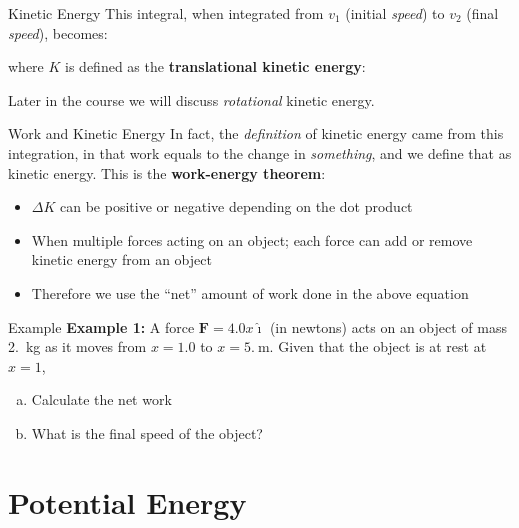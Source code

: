 \documentclass[12pt,compress,aspectratio=169]{beamer}
\begin{document}
\begin{frame}{Kinetic Energy}
  This integral, when integrated from $v_1$ (initial \emph{speed}) to $v_2$
  (final \emph{speed}), becomes:

  
  where $K$ is defined as the \textbf{translational kinetic energy}:


  Later in the course we will discuss \emph{rotational} kinetic energy.
\end{frame}



\begin{frame}{Work and Kinetic Energy}
  In fact, the \emph{definition} of kinetic energy came from this integration,
  in that work equals to the change in \emph{something}, and we define that as
  kinetic energy. This is the \textbf{work-energy theorem}:

  \begin{itemize}
  \item\vspace{-.15in} $\Delta K$ can be positive or negative depending on the
    dot product
  \item When multiple forces acting on an object; each force can add or remove
    kinetic energy from an object
  \item Therefore we use the ``net'' amount of work done in the above equation
  \end{itemize}
\end{frame}



\begin{frame}{Example}
  \textbf{Example 1:} A force $\bm F=4.0x\bm{\hat{\imath}}$ (in newtons) acts
  on an object of mass \SI{2.}{\kilo\gram} as it moves from $x=1.0$ to
  $x=\SI{5.}\metre$. Given that the object is at rest at $x=1$,
  \begin{enumerate}[(a)]
  \item Calculate the net work
  \item What is the final speed of the object?
  \end{enumerate}
\end{frame}



\section{Potential Energy}
\end{document}
